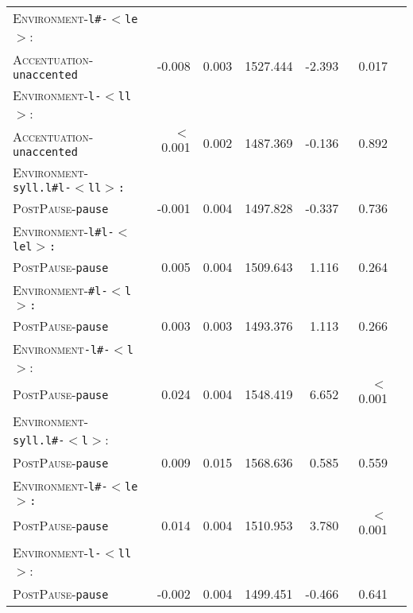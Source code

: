 \begin{table}[H]
\begin{center}
{\begin{tabular} {lrrrrrr}
		\textsc{Environment}-\texttt{l\#-$<$le$>$}:&&&&&\\
		\textsc{Accentuation}-\texttt{unaccented} & -0.008 & 0.003 & 1527.444 & -2.393 & 0.017 \\ 
		
		\textsc{Environment}-\texttt{l-$<$ll$>$}:&&&&&\\
		\textsc{Accentuation}-\texttt{unaccented} & \color[HTML]{9B9B9B} $<$0.001 &\color[HTML]{9B9B9B}  0.002 & \color[HTML]{9B9B9B} 1487.369 &\color[HTML]{9B9B9B}  -0.136 & \color[HTML]{9B9B9B} 0.892 \\ 
		
		\textsc{Environment}-\texttt{syll.l\#l-$<$ll$>$:}&&&&&\\
		\textsc{PostPause}-\texttt{pause} &\color[HTML]{9B9B9B}  -0.001 &\color[HTML]{9B9B9B}  0.004 & \color[HTML]{9B9B9B} 1497.828 &\color[HTML]{9B9B9B}  -0.337 & \color[HTML]{9B9B9B} 0.736 \\ 
		
		\textsc{Environment}-\texttt{l\#l-$<$lel$>$:}&&&&&\\
		\textsc{PostPause}-\texttt{pause} &\color[HTML]{9B9B9B}  0.005 &\color[HTML]{9B9B9B}  0.004 &\color[HTML]{9B9B9B} 1509.643 & \color[HTML]{9B9B9B} 1.116 &\color[HTML]{9B9B9B}  0.264 \\ 
		
		\textsc{Environment}-\texttt{\#l-$<$l$>$:}&&&&&\\
		\textsc{PostPause}-\texttt{pause} & \color[HTML]{9B9B9B} 0.003 &\color[HTML]{9B9B9B}  0.003 & \color[HTML]{9B9B9B} 1493.376 &\color[HTML]{9B9B9B}  1.113 & \color[HTML]{9B9B9B} 0.266 \\ 
		
		\textsc{Environment}\texttt{-l\#-$<$l$>$}:&&&&&\\
		\textsc{PostPause}-\texttt{pause} & 0.024 & 0.004 & 1548.419 & 6.652 &  $<$0.001 \\ 
		
		\textsc{Environment}-\texttt{syll.l\#-$<$l$>$}:&&&&&\\
		\textsc{PostPause}-\texttt{pause} &\color[HTML]{9B9B9B}  0.009 &\color[HTML]{9B9B9B}  0.015 & \color[HTML]{9B9B9B} 1568.636 &\color[HTML]{9B9B9B}  0.585 & \color[HTML]{9B9B9B} 0.559 \\ 
		
		\textsc{Environment}-\texttt{l\#-$<$le$>$:}&&&&&\\
		\textsc{PostPause}-\texttt{pause} & 0.014 & 0.004 & 1510.953 & 3.780 &  $<$0.001 \\
		
		\textsc{Environment}-\texttt{l-$<$ll$>$}:&&&&&\\
		\textsc{PostPause}-\texttt{pause} & \color[HTML]{9B9B9B} -0.002 & \color[HTML]{9B9B9B} 0.004 & \color[HTML]{9B9B9B} 1499.451 &\color[HTML]{9B9B9B}  -0.466 & \color[HTML]{9B9B9B} 0.641 \\ 
		\hline
			\end{tabular}
}
\end{center}

\end{table}


